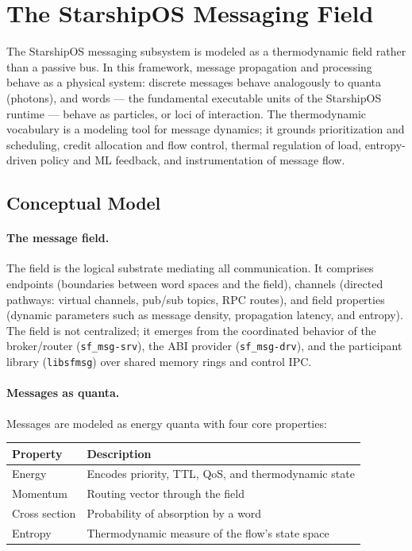 
\section{The StarshipOS Messaging Field}

The StarshipOS messaging subsystem is modeled as a thermodynamic field rather than
a passive bus. In this framework, message propagation and processing behave as a
physical system: discrete messages behave analogously to quanta (photons), and
words --- the fundamental executable units of the StarshipOS runtime --- behave as
particles, or loci of interaction. The thermodynamic vocabulary is a modeling tool
for message dynamics; it grounds prioritization and scheduling, credit allocation
and flow control, thermal regulation of load, entropy-driven policy and ML feedback,
and instrumentation of message flow.

\subsection{Conceptual Model}

\paragraph{The message field.} The field is the logical substrate mediating all
communication. It comprises endpoints (boundaries between word spaces and the
field), channels (directed pathways: virtual channels, pub/sub topics, RPC routes),
and field properties (dynamic parameters such as message density, propagation
latency, and entropy). The field is not centralized; it emerges from the coordinated
behavior of the broker/router (\texttt{sf\_msg-srv}), the ABI provider
(\texttt{sf\_msg-drv}), and the participant library (\texttt{libsfmsg}) over shared
memory rings and control IPC.

\paragraph{Messages as quanta.} Messages are modeled as energy quanta with four core
properties:

\begin{center}
\begin{tabular}{ll}
\toprule
Property & Description \\
\midrule
Energy & Encodes priority, TTL, QoS, and thermodynamic state \\
Momentum & Routing vector through the field \\
Cross section & Probability of absorption by a word \\
Entropy & Thermodynamic measure of the flow's state space \\
\bottomrule
\end{tabular}
\end{center}

